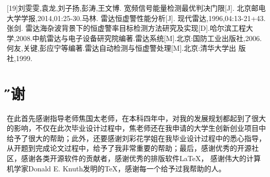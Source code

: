 \documentclass[12pt,a4paper]{article} %
\newcommand{\xiaosanhao}{\fontsize{15pt}{\baselineskip}\selectfont}    %
\newcommand\specialsectioning{\par
  \setcounter{section}{0}%
  \setcounter{subsection}{0}%
  \renewcommand\thesection{\relax}}
\begin{document}
[19]刘雯雯,袁龙,刘子扬,彭涛,王文博. 宽频信号能量检测最优判决门限[J]. 北京邮电大学学报,2014,01:25-30.\newline
[20]马林. 雷达恒虚警性能分析[J]. 现代雷达,1996,04:13-21+43.\newline
[21]张剑. 雷达海杂波背景下的恒虚警率目标检测方法研究及实现[D].哈尔滨工程大 学,2008.\newline
[22] 中航雷达与电子设备研究院编著.雷达系统[M].北京:国防工业出版社,2006. \newline
[23] 何友,关键,彭应宁等编著.雷达自动检测与恒虚警处理[M].北京:清华大学出 版社,1999.
    \newpage
\specialsectioning
\titleformat{\section}{\centering\Huge\bfseries}{\,\thechapter\,}{1em}{}
      \section{\xiaosanhao \H 致谢}

在此首先感谢指导老师焦国太老师，在本科四年中，对我的发展规划都起到了很大的影响，不仅在此次毕业设计过程中，焦老师还在我申请的大学生创新创业项目中给予了很大的帮助；此外，还要感谢刘彩花学姐在我毕业设计过程中的悉心指导，从开题到完成论文过程中，给予了我非常重要的帮助；最后，感谢优秀的开源社区，感谢各类开源软件的贡献者，感谢优秀的排版软件\LaTeX， 感谢伟大的计算机学家Donald E. Knuth发明的\TeX ，感谢每一个给予过我帮助的人。
 
\end{document}
